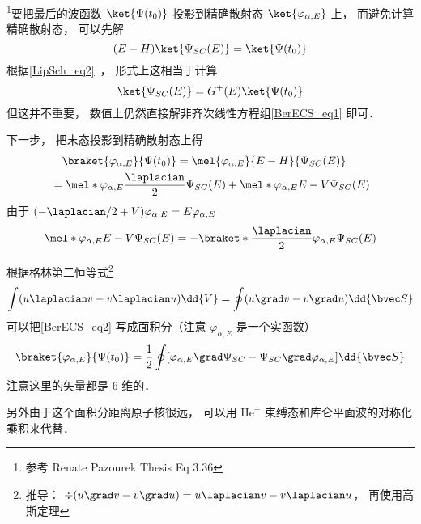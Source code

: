 
\footnote{参考 Renate Pazourek Thesis Eq 3.36}要把最后的波函数 $\ket{\Psi(t_0)}$ 投影到精确散射态 $\ket{\varphi_{\alpha,E}}$ 上， 而避免计算精确散射态， 可以先解
\begin{equation}\label{BerECS_eq1}
(E-H)\ket{\Psi_{SC}(E)} = \ket{\Psi(t_0)}
\end{equation}
根据\autoref{LipSch_eq2}~， 形式上这相当于计算
\begin{equation}
\ket{\Psi_{SC}(E)} = G^+(E)\ket{\Psi(t_0)}
\end{equation}
但这并不重要， 数值上仍然直接解非齐次线性方程组\autoref{BerECS_eq1} 即可．

下一步， 把末态投影到精确散射态上得
\begin{equation}\label{BerECS_eq2}
\begin{aligned}
&\quad \braket{\varphi_{\alpha,E}}{\Psi(t_0)} = \mel{\varphi_{\alpha,E}}{E-H}{\Psi_{SC}(E)}\\
&= \mel*{\varphi_{\alpha,E}}{\frac{\laplacian}{2}}{\Psi_{SC}(E)} + \mel*{\varphi_{\alpha,E}}{E-V}{\Psi_{SC}(E)}
\end{aligned}
\end{equation}
由于 $(-\laplacian/2+V)\varphi_{\alpha,E} = E\varphi_{\alpha,E}$
\begin{equation}
\mel*{\varphi_{\alpha,E}}{E-V}{\Psi_{SC}(E)} = -\braket*{\frac{\laplacian}{2} \varphi_{\alpha,E}}{\Psi_{SC}(E)}
\end{equation}

根据格林第二恒等式\footnote{推导： $\div(u\grad v - v\grad u) = u\laplacian v - v\laplacian u$， 再使用高斯定理}
\begin{equation}
\int (u\laplacian v - v\laplacian u)\dd{V} = \oint (u\grad v - v\grad u) \dd{\bvec S}
\end{equation}
可以把\autoref{BerECS_eq2} 写成面积分（注意 $\varphi_{\alpha,E}$ 是一个实函数）
\begin{equation}
\braket{\varphi_{\alpha,E}}{\Psi(t_0)} = \frac{1}{2} \oint [\varphi_{\alpha,E} \grad \Psi_{SC} - \Psi_{SC} \grad \varphi_{\alpha,E}] \dd{\bvec S}
\end{equation}
注意这里的矢量都是 6 维的．

另外由于这个面积分距离原子核很远， 可以用 $\mathrm{He}^+$ 束缚态和库仑平面波的对称化乘积来代替．
